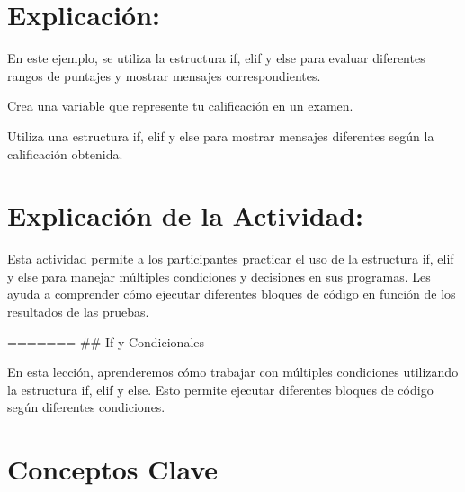 \documentclass[
  a4paper,
  onepage,
  openany]{scrreprt}
\begin{document}
\hypertarget{explicaciuxf3n-30}{%
\section{Explicación:}\label{explicaciuxf3n-30}}

En este ejemplo, se utiliza la estructura if, elif y else para evaluar
diferentes rangos de puntajes y mostrar mensajes correspondientes.

\begin{tcolorbox}[enhanced jigsaw, breakable, opacityback=0, toptitle=1mm, coltitle=black, toprule=.15mm, rightrule=.15mm, colframe=quarto-callout-important-color-frame, opacitybacktitle=0.6, arc=.35mm, title=\textcolor{quarto-callout-important-color}{\faExclamation}\hspace{0.5em}{Actividad Práctica:}, titlerule=0mm, colbacktitle=quarto-callout-important-color!10!white, bottomtitle=1mm, bottomrule=.15mm, colback=white, left=2mm, leftrule=.75mm]

Crea una variable que represente tu calificación en un examen.

Utiliza una estructura if, elif y else para mostrar mensajes diferentes
según la calificación obtenida.

\end{tcolorbox}

\hypertarget{explicaciuxf3n-de-la-actividad-28}{%
\section{Explicación de la
Actividad:}\label{explicaciuxf3n-de-la-actividad-28}}

Esta actividad permite a los participantes practicar el uso de la
estructura if, elif y else para manejar múltiples condiciones y
decisiones en sus programas. Les ayuda a comprender cómo ejecutar
diferentes bloques de código en función de los resultados de las
pruebas.

======= \#\# If y Condicionales

En esta lección, aprenderemos cómo trabajar con múltiples condiciones
utilizando la estructura if, elif y else. Esto permite ejecutar
diferentes bloques de código según diferentes condiciones.

\hypertarget{conceptos-clave-31}{%
\section{Conceptos Clave}\label{conceptos-clave-31}}
\end{document}
